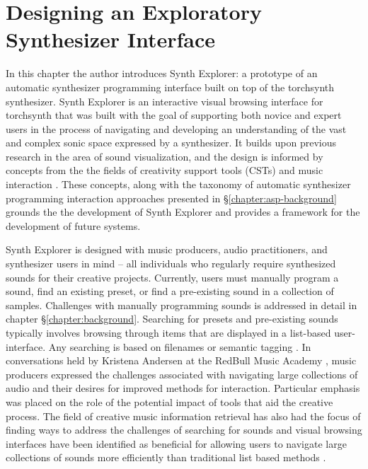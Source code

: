 \graphicspath{{./}{./figures/}{./figures/synthexplore/}}




\chapter{Designing an Exploratory Synthesizer Interface}
\label{chapter:synth-explore}

In this chapter the author introduces Synth Explorer: a prototype of an automatic synthesizer programming interface built on top of the torchsynth synthesizer. Synth Explorer is an interactive visual browsing interface for torchsynth that was built with the goal of supporting both novice and expert users in the process of navigating and developing an understanding of the vast and complex sonic space expressed by a synthesizer. It builds upon previous research in the area of sound visualization, and the design is informed by concepts from the the fields of creativity support tools (CSTs) and music interaction \cite{shneiderman2007creativity, holland2013music}. These concepts, along with the taxonomy of automatic synthesizer programming interaction approaches presented in \S\ref{chapter:asp-background} grounds the the development of Synth Explorer and provides a framework for the development of future systems. %

Synth Explorer is designed with music producers, audio practitioners, and synthesizer users in mind -- all individuals who regularly require synthesized sounds for their creative projects. Currently, users must manually program a sound, find an existing preset, or find a pre-existing sound in a collection of samples. Challenges with manually programming sounds is addressed in detail in chapter \S\ref{chapter:background}. Searching for presets and pre-existing sounds typically involves browsing through items that are displayed in a list-based user-interface. Any searching is based on filenames or semantic tagging \cite{knees2016searching}. In conversations held by Kristena Andersen at the RedBull Music Academy \cite{andersen2016conversations}, music producers expressed the challenges associated with navigating large collections of audio and their desires for improved methods for interaction. Particular emphasis was placed on the role of the potential impact of tools that aid the creative process. The field of creative music information retrieval has also had the focus of finding ways to address the challenges of searching for sounds \cite{humphrey2013brief} and visual browsing interfaces have been identified as beneficial for allowing users to navigate large collections of sounds more efficiently than traditional list based methods \cite{turquois2016exploring}.

